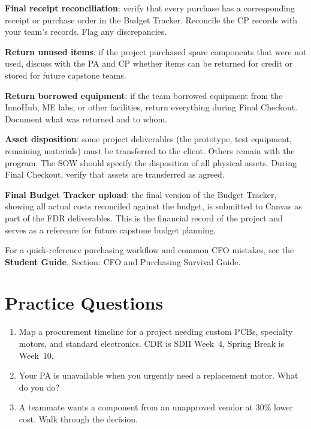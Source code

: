 \textbf{Final receipt reconciliation}: verify that every purchase has a corresponding receipt or purchase order in the Budget Tracker. Reconcile the CP records with your team's records. Flag any discrepancies.

\textbf{Return unused items}: if the project purchased spare components that were not used, discuss with the PA and CP whether items can be returned for credit or stored for future capstone teams.

\textbf{Return borrowed equipment}: if the team borrowed equipment from the InnoHub, ME labs, or other facilities, return everything during Final Checkout. Document what was returned and to whom.

\textbf{Asset disposition}: some project deliverables (the prototype, test equipment, remaining materials) must be transferred to the client. Others remain with the program. The SOW should specify the disposition of all physical assets. During Final Checkout, verify that assets are transferred as agreed.

\textbf{Final Budget Tracker upload}: the final version of the Budget Tracker, showing all actual costs reconciled against the budget, is submitted to Canvas as part of the FDR deliverables. This is the financial record of the project and serves as a reference for future capstone budget planning.


\begin{tipbox}
For a quick-reference purchasing workflow and common CFO mistakes, see the \textbf{Student Guide}, Section: CFO and Purchasing Survival Guide.
\end{tipbox}

\section{Practice Questions}
\begin{enumerate}[leftmargin=1.5em]
\item Map a procurement timeline for a project needing custom PCBs, specialty motors, and standard electronics. CDR is SDII Week~4, Spring Break is Week~10.
\item Your PA is unavailable when you urgently need a replacement motor. What do you do?
\item A teammate wants a component from an unapproved vendor at 30\% lower cost. Walk through the decision.
\end{enumerate}


